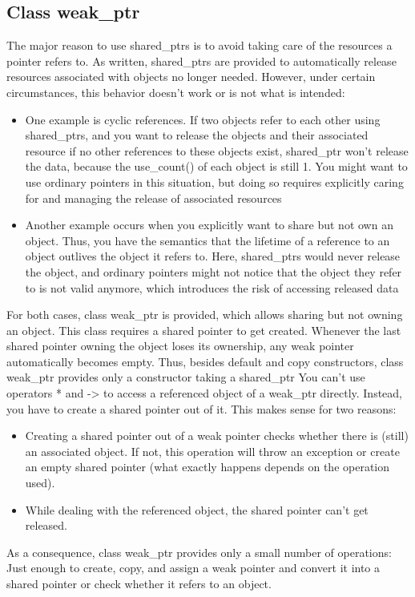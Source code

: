 \documentclass{report}
\begin{document}
\subsection{Class weak\_ptr}
\bigbreak \noindent 
The major reason to use shared\_ptrs is to avoid taking care of the resources a pointer refers to. As written, shared\_ptrs are provided to automatically release resources associated with objects no longer needed.
\bigbreak \noindent 
However, under certain circumstances, this behavior doesn’t work or is not what is intended:
\begin{itemize}
    \item One example is cyclic references. If two objects refer to each other using shared\_ptrs, and you want to release the objects and their associated resource if no other references to these objects exist, shared\_ptr won’t release the data, because the use\_count() of each object is still 1. You might want to use ordinary pointers in this situation, but doing so requires explicitly caring for and managing the release of associated resources
    \item Another example occurs when you explicitly want to share but not own an object. Thus, you have the semantics that the lifetime of a reference to an object outlives the object it refers to. Here, shared\_ptrs would never release the object, and ordinary pointers might not notice that the object they refer to is not valid anymore, which introduces the risk of accessing released data
\end{itemize}
\bigbreak \noindent 
For both cases, class weak\_ptr is provided, which allows sharing but not owning an object. This
class requires a shared pointer to get created. Whenever the last shared pointer owning the object
loses its ownership, any weak pointer automatically becomes empty. Thus, besides default and copy
constructors, class weak\_ptr provides only a constructor taking a shared\_ptr
\bigbreak \noindent 
You can’t use operators * and -> to access a referenced object of a weak\_ptr directly. Instead, you have to create a shared pointer out of it. This makes sense for two reasons:
\begin{itemize}
    \item Creating a shared pointer out of a weak pointer checks whether there is (still) an associated object. If not, this operation will throw an exception or create an empty shared pointer (what exactly happens depends on the operation used).
    \item While dealing with the referenced object, the shared pointer can’t get released.
\end{itemize}
As a consequence, class weak\_ptr provides only a small number of operations: Just enough to create, copy, and assign a weak pointer and convert it into a shared pointer or check whether it refers to an object.
\bigbreak \noindent 
\end{document}

